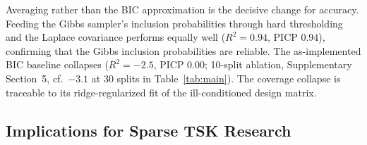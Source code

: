 \documentclass[review,1p,times]{elsarticle}
\begin{document}
Averaging rather than the BIC approximation is the decisive change for accuracy.
Feeding the Gibbs sampler's inclusion probabilities through hard thresholding and the Laplace covariance performs equally well ($R^2=0.94$, PICP $0.94$), confirming that the Gibbs inclusion probabilities are reliable.
The as-implemented BIC baseline collapses ($R^2=-2.5$, PICP $0.00$; 10-split ablation, Supplementary Section~5, cf.\ $-3.1$ at 30 splits in Table~\ref{tab:main}).
The coverage collapse is traceable to its ridge-regularized fit of the ill-conditioned design matrix.

\subsection{Implications for Sparse TSK Research}
\end{document}
